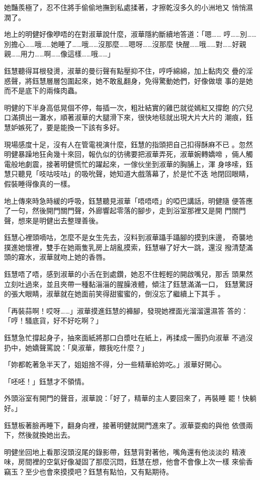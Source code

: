 她豔羨極了，忍不住將手偷偷地撫到私處揉著，才擦乾沒多久的小洲地又
悄悄濕潤了。

地上的明健好像咿唔的在對淑華說什麼，淑華隱約斷續地答道：「嗯……
哼……別……別擔心……哦……她睡了……哦……沒那麼……嗯呀……沒那麼
快醒……哦……對……好親親……用力……啊……像這樣……哦……」

鈺慧聽得耳根發燙，淑華的曼衍聲有點壓抑不住，哼呼綿綿，加上黏肉交
疊的淫惑聲，將鈺慧層層包圍起來，她不敢亂翻身，免得驚動她們，好像做壞
事的是她而不是底下的兩條肉蟲。

明健的下半身高低晃個不停，每插一次，粗壯結實的雞巴就從嫣紅又撐飽
的穴兒口滿擠出一灘水，順著淑華的大腿滑下來，很快地毯就出現大片大片的
潮痕，鈺慧妒嫉死了，要是能換一下該有多好。

現場感度十足，沒有人在管電視演什麼，鈺慧的指頭把自己扣得酥麻不已
。忽然明健暴躁地狂肏幾十來回，報仇似的彷彿要把淑華弄死，淑華婉轉嬌啼
，倆人觸電般地劇震，接著明健慌忙的躍起來，一傢伙坐到淑華的胸脯上，渾
身哆嗦，鈺慧只聽見「吱咕吱咕」的吸吮聲，她知道大戲落幕了，於是忙不迭
地閉回眼睛，假裝睡得像真的一樣。

地上傳來時急時緩的呼吸，鈺慧聽見淑華「唔唔唔」的啞巴講話，明健隨
便答應了一句，然後開門關門聲，外廊響起零落的腳步，走到浴室那裡又是開
門關門聲，想來是明健出去整理善後。

鈺慧心裡頭嘀咕，怎麼不是女生先去，沒料到淑華躡手躡腳的摸到床邊，
奇襲地撲進她懷裡，雙手在她兩隻乳房上胡亂摸索，鈺慧嚇了好大一跳，還沒
撥清楚滿頭的霧水，淑華就吻上她的香唇。

鈺慧唔了唔，感到淑華的小舌在到處鑽，她忍不住輕輕的開啟嘴兒，那舌
頭果然立刻吐過來，並且夾帶一種黏淄淄的腥臊液體，傾注了鈺慧滿滿一口，
鈺慧驚訝的張大眼睛，淑華就在她面前笑得甜蜜蜜的，倒沒忘了繼續上下其手
。

「再裝蒜啊！哎呀……」淑華摸進鈺慧的褲腳，發現她裡面光溜溜還濕答
答的：「哼！騷底貨，好不好吃啊？」

鈺慧急忙撐起身子，抽來面紙將那口白漿吐在紙上，再揉成一團扔向淑華
不過沒扔中，她嬌聲罵說：「臭淑華，餵我吃什麼？」

「妳都乾著急半天了，姐姐捨不得，分一些精華給妳吃。」淑華好開心。

「呸呸！」鈺慧才不領情。

外頭浴室有開門的聲音，淑華說：「好了，精華的主人要回來了，再裝睡
罷！快躺好。」

鈺慧板著臉再睡下，翻身向裡，接著明健就開門進來了。淑華耍痴的與他
依偎兩下，然後就換她出去。

明健坐回地上看那沒頭沒尾的錄影帶，鈺慧背對著他，嘴角還有他淡淡的
精液味，房間裡的空氣好像凝固了那麼沉悶，鈺慧在想，他會不會像上次一樣
來偷香竊玉？至少也會來摸摸吧？鈺慧有點怕，又有點期待。


